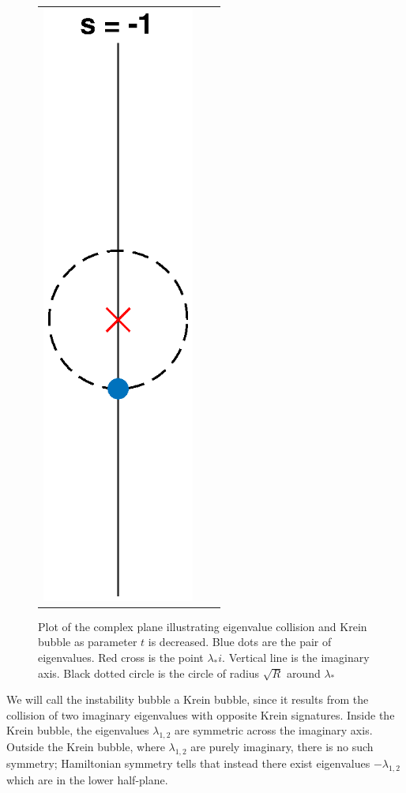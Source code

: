 \documentclass[thesis.tex]{subfiles}
\begin{document}
\begin{figure}[H]
\begin{center}
\begin{tabular}{ccc}
\includegraphics[width=5cm]{images/kreinbubbles/bubbleminusR}
\end{tabular}
\caption{Plot of the complex plane illustrating eigenvalue collision and Krein bubble as parameter $t$ is decreased. Blue dots are the pair of eigenvalues. Red cross is the point $\lambda_* i$. Vertical line is the imaginary axis. Black dotted circle is the circle of radius $\sqrt{R}$ around $\lambda_*$ }
\label{fig:kreinbubbles}
\end{center}
\end{figure}

We will call the instability bubble a Krein bubble, since it results from the collision of two imaginary eigenvalues with opposite Krein signatures. Inside the Krein bubble, the eigenvalues $\lambda_{1,2}$ are symmetric across the imaginary axis. Outside the Krein bubble, where $\lambda_{1,2}$ are purely imaginary, there is no such symmetry; Hamiltonian symmetry tells that instead there exist eigenvalues $-\lambda_{1,2}$ which are in the lower half-plane.
\end{document}

